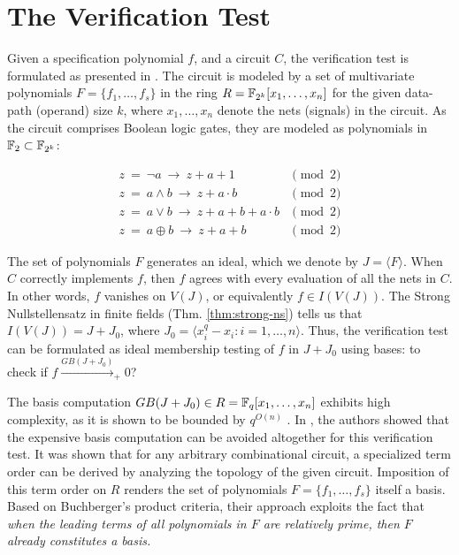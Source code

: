 \section{The Verification Test}
\label{sec:verify}

Given a specification polynomial $f$, and a circuit $C$, the
verification test is formulated as presented in
\cite{lv:tcad2013}. The circuit is modeled by a set of multivariate
polynomials $F=\{f_1,\dots,f_s\}$ in the ring $R={\mathbb{F}}_{2^k}[x_1,\dots,x_n]$
for the given data-path (operand) size $k$, where $x_1,\dots,x_n$
denote the nets (signals) in the circuit. As the circuit comprises
Boolean logic gates, they are modeled as polynomials in ${\mathbb{F}}_2 \subset
{\mathbb{F}}_{2^k}$:

\begin{equation}
\label{bool2poly}
\begin{split}
z ~ =  ~ \neg a ~ \rightarrow ~ z+a+1 & \pmod 2  \\
z ~ =  ~ a \wedge b ~ \rightarrow ~ z+a \cdot b & \pmod 2\\
z ~ =  ~ a \vee b ~ \rightarrow ~ z+a+b+a \cdot b & \pmod 2 \\
z ~ =  ~ a \oplus b ~ \rightarrow ~ z+a+b & \pmod 2 
\end{split}
\end{equation}

The set of polynomials $F$ generates an ideal, which we denote by $J =
\langle F\rangle$. When $C$ correctly implements $f$, then $f$ agrees
with every evaluation of all the nets in $C$. In other words, $f$
vanishes on $V(J)$, or equivalently $f \in I(V(J))$. The Strong
Nullstellensatz in finite fields (Thm. \ref{thm:strong-ns}) tells us
that $I(V(J)) = J + J_0$, where $J_0 = \langle x_i^q-x_i:
i=1,\dots,n\rangle$. Thus, the verification test can be formulated as
ideal membership testing of $f$ in $J+J_0$ using \Grobner bases: to
check if $f\xrightarrow{GB(J+J_0)}_+0$?

The \Grobner basis computation $GB(J+J_0)\in R={\mathbb{F}}_q[x_1,\dots,x_n]$ exhibits high
complexity, as it is shown to be bounded by
$q^{O(n)}$ \cite{gao:qe-gf-gb}. In \cite{lv:tcad2013}, the authors showed that the expensive \Grobner
basis computation can be avoided altogether for this verification
test. It was shown that for any arbitrary combinational circuit, a
specialized term order can be derived by analyzing the topology of the
given circuit. Imposition of this term order on $R$ renders the set of
polynomials $F=\{f_1,\dots,f_s\}$ itself a \Grobner basis. Based on
Buchberger's product criteria, their approach exploits the fact
that {\it when the leading terms of all polynomials in $F$ are
  relatively prime, then $F$ already constitutes a \Grobner basis.}

